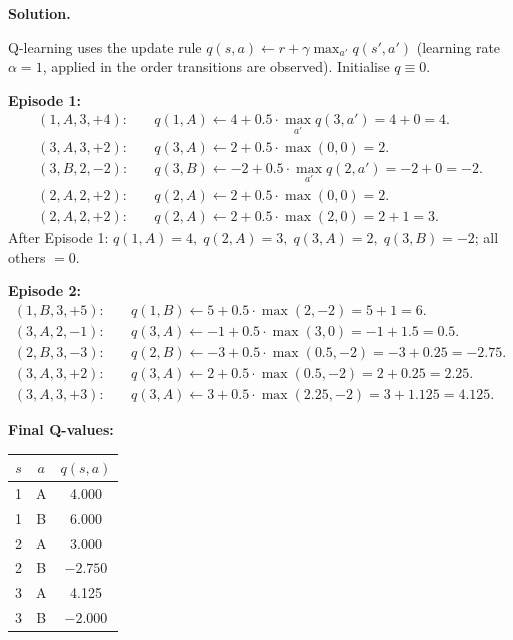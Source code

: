 \documentclass[12pt]{article}
\newenvironment{solution}{%
  \ifshowsolutions\begin{solutionbox}\noindent\textbf{\color{blue!70!black}Solution.}\quad\fi
  \ifshowsolutions\else\expandafter\comment\fi
}{%
  \ifshowsolutions\end{solutionbox}\fi
  \ifshowsolutions\else\expandafter\endcomment\fi
}
\begin{document}
\begin{enumerate}
        \begin{solution}
          Q-learning uses the update rule $q(s,a) \leftarrow r + \gamma \max_{a'} q(s',a')$ (learning rate $\alpha=1$, applied in the order transitions are observed). Initialise $q\equiv 0$.

          \textbf{Episode 1:}
          \begin{align*}
            (1,A,3,+4):\quad & q(1,A) \leftarrow 4 + 0.5\cdot\max_{a'}q(3,a') = 4 + 0 = 4.\\
            (3,A,3,+2):\quad & q(3,A) \leftarrow 2 + 0.5\cdot\max(0,0) = 2.\\
            (3,B,2,-2):\quad & q(3,B) \leftarrow -2 + 0.5\cdot\max_{a'}q(2,a') = -2 + 0 = -2.\\
            (2,A,2,+2):\quad & q(2,A) \leftarrow 2 + 0.5\cdot\max(0,0) = 2.\\
            (2,A,2,+2):\quad & q(2,A) \leftarrow 2 + 0.5\cdot\max(2,0) = 2 + 1 = 3.
          \end{align*}
          After Episode 1: $q(1,A)=4,\;q(2,A)=3,\;q(3,A)=2,\;q(3,B)=-2$; all others $= 0$.

          \textbf{Episode 2:}
          \begin{align*}
            (1,B,3,+5):\quad & q(1,B) \leftarrow 5 + 0.5\cdot\max(2,-2) = 5 + 1 = 6.\\
            (3,A,2,-1):\quad & q(3,A) \leftarrow -1 + 0.5\cdot\max(3,0) = -1 + 1.5 = 0.5.\\
            (2,B,3,-3):\quad & q(2,B) \leftarrow -3 + 0.5\cdot\max(0.5,-2) = -3 + 0.25 = -2.75.\\
            (3,A,3,+2):\quad & q(3,A) \leftarrow 2 + 0.5\cdot\max(0.5,-2) = 2 + 0.25 = 2.25.\\
            (3,A,3,+3):\quad & q(3,A) \leftarrow 3 + 0.5\cdot\max(2.25,-2) = 3 + 1.125 = 4.125.
          \end{align*}

          \textbf{Final Q-values:}
          \begin{center}
          \begin{tabular}{|c|c|c|}
            \hline
            $s$ & $a$ & $q(s,a)$ \\\hline
            1 & A & 4.000 \\\hline
            1 & B & 6.000 \\\hline
            2 & A & 3.000 \\\hline
            2 & B & $-2.750$ \\\hline
            3 & A & 4.125 \\\hline
            3 & B & $-2.000$ \\\hline
          \end{tabular}
          \end{center}
        \end{solution}
        \end{enumerate}
\end{document}
